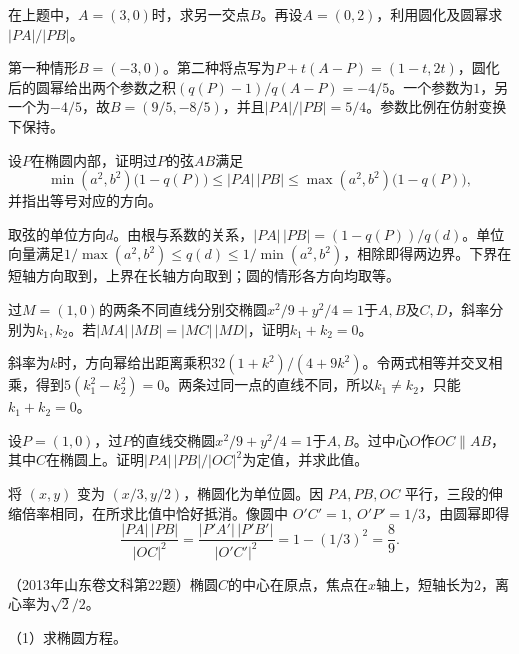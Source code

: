 在上题中，\(A=(3,0)\)时，求另一交点\(B\)。再设\(A=(0,2)\)，利用圆化及圆幂求\(|PA|/|PB|\)。
\par
\solutionanswer
第一种情形\(B=(-3,0)\)。第二种将点写为\(P+t(A-P)=(1-t,2t)\)，圆化后的圆幂给出两个参数之积\((q(P)-1)/q(A-P)=-4/5\)。一个参数为\(1\)，另一个为\(-4/5\)，故\(B=(9/5,-8/5)\)，并且\(|PA|/|PB|=5/4\)。参数比例在仿射变换下保持。


设\(P\)在椭圆内部，证明过\(P\)的弦\(AB\)满足
\begin{equation*}
    \min(a^2,b^2)\bigl(1-q(P)\bigr)\le |PA|\,|PB|
    \le\max(a^2,b^2)\bigl(1-q(P)\bigr) ,
\end{equation*}
并指出等号对应的方向。
\par
\solutionanswer
取弦的单位方向\(d\)。由根与系数的关系，\(|PA|\,|PB|=(1-q(P))/q(d)\)。单位向量满足\(1/\max(a^2,b^2)\le q(d)\le1/\min(a^2,b^2)\)，相除即得两边界。下界在短轴方向取到，上界在长轴方向取到；圆的情形各方向均取等。


过\(M=(1,0)\)的两条不同直线分别交椭圆\(x^2/9+y^2/4=1\)于\(A,B\)及\(C,D\)，斜率分别为\(k_1,k_2\)。若\(|MA|\,|MB|=|MC|\,|MD|\)，证明\(k_1+k_2=0\)。
\par
\solutionanswer
斜率为\(k\)时，方向幂给出距离乘积\(32(1+k^2)/(4+9k^2)\)。令两式相等并交叉相乘，得到\(5(k_1^2-k_2^2)=0\)。两条过同一点的直线不同，所以\(k_1\ne k_2\)，只能\(k_1+k_2=0\)。


设\(P=(1,0)\)，过\(P\)的直线交椭圆\(x^2/9+y^2/4=1\)于\(A,B\)。过中心\(O\)作\(OC\parallel AB\)，其中\(C\)在椭圆上。证明\(|PA|\,|PB|/|OC|^2\)为定值，并求此值。
\par
\solutionanswer
将 \((x,y)\) 变为 \((x/3,y/2)\)，椭圆化为单位圆。因 \(PA,PB,OC\) 平行，三段的伸缩倍率相同，在所求比值中恰好抵消。像圆中 \(O'C'=1,\ O'P'=1/3\)，由圆幂即得
\[
 \frac{|PA|\,|PB|}{|OC|^2}=\frac{|P'A'|\,|P'B'|}{|O'C'|^2}=1-(1/3)^2=\frac89.
\]


（2013年山东卷文科第22题）椭圆\(C\)的中心在原点，焦点在\(x\)轴上，短轴长为\(2\)，离心率为\(\sqrt2/2\)。


（1）求椭圆方程。
\par



